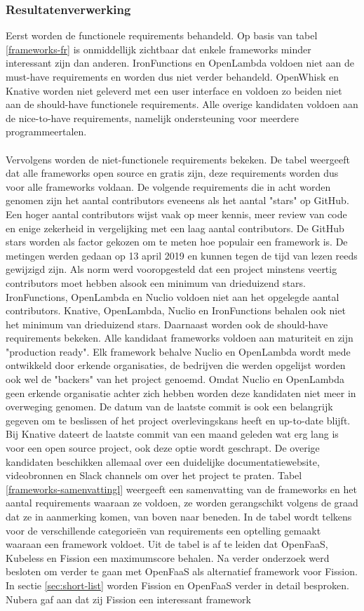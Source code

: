 \subsubsection{Resultatenverwerking}
Eerst worden de functionele requirements behandeld. Op basis van tabel \ref{frameworks-fr} is onmiddellijk zichtbaar dat enkele frameworks minder interessant zijn dan anderen. IronFunctions en OpenLambda voldoen niet aan de must-have requirements en worden dus niet verder behandeld. OpenWhisk en Knative worden niet geleverd met een user interface en voldoen zo beiden niet aan de should-have functionele requirements. Alle overige kandidaten voldoen aan de nice-to-have requirements, namelijk ondersteuning voor meerdere programmeertalen.
\\\\
Vervolgens worden de niet-functionele requirements bekeken. De tabel weergeeft dat alle frameworks open source en gratis zijn, deze requirements worden dus voor alle frameworks voldaan. De volgende requirements die in acht worden genomen zijn het aantal contributors eveneens als het aantal "stars" op GitHub. Een hoger aantal contributors wijst vaak op meer kennis, meer review van code en enige zekerheid in vergelijking met een laag aantal contributors. De GitHub stars worden als factor gekozen om te meten hoe populair een framework is. De metingen werden gedaan op 13 april 2019 en kunnen tegen de tijd van lezen reeds gewijzigd zijn. Als norm werd vooropgesteld dat een project minstens veertig contributors moet hebben alsook een minimum van drieduizend stars. IronFunctions, OpenLambda en Nuclio voldoen niet aan het opgelegde aantal contributors. Knative, OpenLambda, Nuclio en IronFunctions behalen ook niet het minimum van drieduizend stars. Daarnaast worden ook de should-have requirements bekeken. Alle kandidaat frameworks voldoen aan maturiteit en zijn "production ready". Elk framework behalve Nuclio en OpenLambda wordt mede ontwikkeld door erkende organisaties, de bedrijven die werden opgelijst worden ook wel de "backers" van het project genoemd. Omdat Nuclio en OpenLambda geen erkende organisatie achter zich hebben worden deze kandidaten niet meer in overweging genomen. De datum van de laatste commit is ook een belangrijk gegeven om te beslissen of het project overlevingskans heeft en up-to-date blijft. Bij Knative dateert de laatste commit van een maand geleden wat erg lang is voor een open source project, ook deze optie wordt geschrapt. De overige kandidaten beschikken allemaal over een duidelijke documentatiewebsite, videobronnen en Slack channels om over het project te praten. Tabel \ref{frameworks-samenvattingl} weergeeft een samenvatting van de frameworks en het aantal requirements waaraan ze voldoen, ze worden gerangschikt volgens de graad dat ze in aanmerking komen, van boven naar beneden. In de tabel wordt telkens voor de verschillende categorieën van requirements een optelling gemaakt waaraan een framework voldoet. Uit de tabel is af te leiden dat OpenFaaS, Kubeless en Fission een maximumscore behalen. Na verder onderzoek werd besloten om verder te gaan met OpenFaaS als alternatief framework voor Fission. In sectie \ref{sec:short-list} worden Fission en OpenFaaS verder in detail besproken. Nubera gaf aan dat zij Fission een interessant framework 